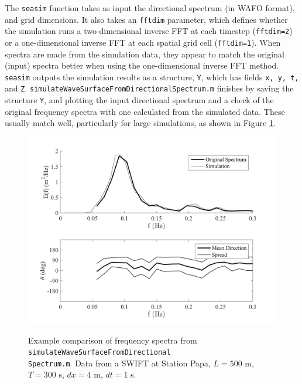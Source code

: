 \documentclass[11pt]{article}
\begin{document}
The \texttt{seasim} function takes as input the directional spectrum (in WAFO format), and grid dimensions.  It also takes an \texttt{fftdim} parameter, which defines whether the simulation runs a two-dimensional inverse FFT at each timestep (\texttt{fftdim=2}) or a one-dimensional inverse FFT at each spatial grid cell (\texttt{fftdim=1}).  When spectra are made from the simulation data, they appear to match the original (input) spectra better when using the one-dimensional inverse FFT method.  \texttt{seasim} outputs the simulation results as a structure, \texttt{Y}, which has fields \texttt{x, y, t,} and \texttt{Z}.  \texttt{simulateWaveSurfaceFromDirectionalSpectrum.m} finishes by saving the structure \texttt{Y}, and plotting the input directional spectrum and a check of the original frequency spectra with one calculated from the simulated data.  These usually match well, particularly for large simulations, as shown in Figure \ref{fig:FrequencySpectraComparison}.

\begin{figure}[t]
    \centering
    \noindent\includegraphics[width=5.5in]{FrequencySpectra.png}\\
   \vspace{-0in}\caption{Example comparison of frequency spectra from \texttt{simulateWaveSurfaceFromDirectional\\Spectrum.m}.  Data from a SWIFT at Station Papa, $L = 500$ m, $T = 300$ s, $dx = 4$ m, $dt = 1$ s.}\label{fig:FrequencySpectraComparison}
\end{figure}
\end{document}
